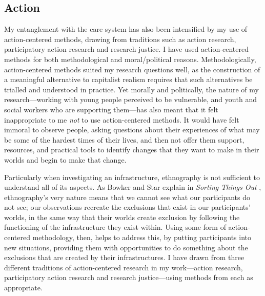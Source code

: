 \subsection{Action}
\label{sec:3-2-2-action}
My entanglement with the care system has also been intensified by my use of action-centered methods, drawing from traditions such as action research, participatory action research and research justice. I have used action-centered methods for both methodological and moral/political reasons. Methodologically, action-centered methods suited my research questions well, as the construction of a meaningful alternative to capitalist realism requires that such alternatives be trialled and understood in practice. Yet morally and politically, the nature of my research—working with young people perceived to be vulnerable, and youth and social workers who are supporting them—has also meant that it felt inappropriate to me \textit{not} to use action-centered methods. It would have felt immoral to observe people, asking questions about their experiences of what may be some of the hardest times of their lives, and then not offer them support, resources, and practical tools to identify changes that they want to make in their worlds and begin to make that change.

Particularly when investigating an infrastructure, ethnography is not sufficient to understand all of its aspects. As Bowker and Star explain in \textit{Sorting Things Out} \citep{bowker_sorting_1999}, ethnography's very nature means that we cannot see what our participants do not see; our observations recreate the exclusions that exist in our participants' worlds, in the same way that their worlds create exclusion by following the functioning of the infrastructure they exist within. Using some form of action-centered methodology, then, helps to address this, by putting participants into new situations, providing them with opportunities to do something about the exclusions that are created by their infrastructures. I have drawn from three different traditions of action-centered research in my work—action research, participatory action research and research justice—using methods from each as appropriate. 

